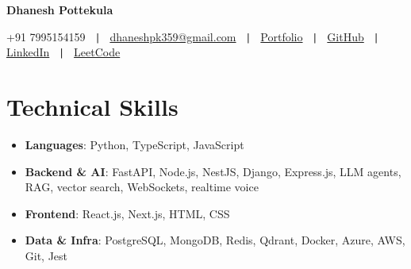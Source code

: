 \documentclass[a4paper,10pt]{article}
\newcommand{\resumeItem}[2]{
  \item\small{
    \textbf{#1}{: #2 \vspace{-2pt}}
  }
}
\newcommand{\resumeSubItem}[2]{\resumeItem{#1}{#2}\vspace{-3pt}}
\newcommand{\resumeSubHeadingListStart}{\begin{itemize}[leftmargin=*]}
\newcommand{\resumeSubHeadingListEnd}{\end{itemize}}
\begin{document}
\begin{center}
    \textbf{\LARGE Dhanesh Pottekula}
\end{center}

\begin{center}
    +91 7995154159 \texttt{ | } \href{mailto:dhaneshpk359@gmail.com}{dhaneshpk359@gmail.com} \texttt{ | } \href{https://portfolio-roan-five-40.vercel.app/}{Portfolio} \texttt{ | } \href{https://github.com/Dhanesh-Pottekula}{GitHub} \texttt{ | } \href{https://www.linkedin.com/in/dhanesh-pottekula-a40900230/}{LinkedIn} \texttt{ | } \href{https://leetcode.com/u/Dhanesh_Pottekula/}{LeetCode}
\end{center}

\vspace{-5pt}
\section{Technical Skills}
    \resumeSubHeadingListStart
        \resumeSubItem{Languages}{Python, TypeScript, JavaScript}
        \resumeSubItem{Backend \& AI}{FastAPI, Node.js, NestJS, Django, Express.js, LLM agents, RAG, vector search, WebSockets, realtime voice}
        \resumeSubItem{Frontend}{React.js, Next.js, HTML, CSS}
        \resumeSubItem{Data \& Infra}{PostgreSQL, MongoDB, Redis, Qdrant, Docker, Azure, AWS, Git, Jest}
    \resumeSubHeadingListEnd


\vspace{-0pt}
\end{document}
